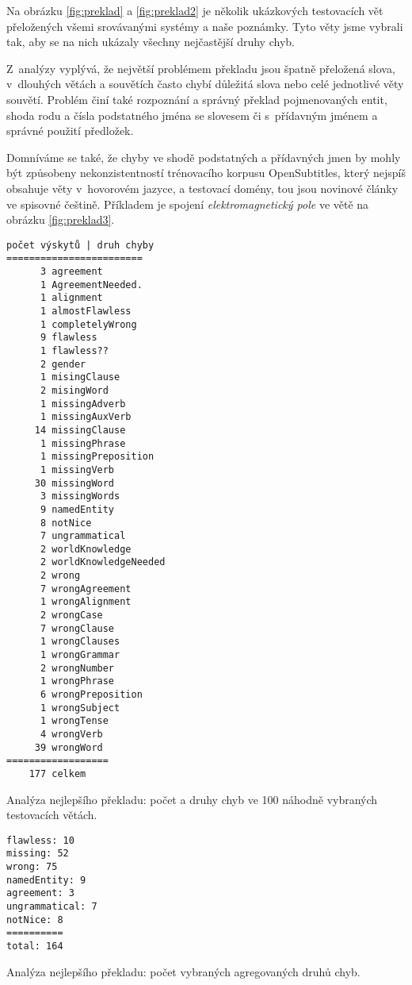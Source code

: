 \documentclass[a4]{article}
\begin{document}
Na obrázku \ref{fig:preklad} a \ref{fig:preklad2} je několik ukázkových
testovacích vět přeložených všemi srovávanými systémy a naše poznámky. Tyto věty
jsme vybrali tak, aby se na nich ukázaly všechny nejčastější druhy
chyb.

Z~analýzy vyplývá, že největší problémem překladu jsou špatně přeložená slova,
v~dlouhých větách a souvětích často chybí důležitá slova nebo celé jednotlivé věty
souvětí. Problém činí také rozpoznání a správný překlad pojmenovaných entit,
shoda rodu a čísla podstatného jména se slovesem či s~přídavným jménem
a správné použití předložek.

Domníváme se také, že chyby ve shodě podstatných a přídavných jmen by mohly být
způsobeny nekonzistentností trénovacího korpusu OpenSubtitles, který nejspíš
obsahuje věty v~hovorovém jazyce, a testovací domény, tou jsou novinové články
ve spisovné češtině. Příkladem je spojení \textit{elektromagnetický pole} ve
větě na obrázku \ref{fig:preklad3}.


\begin{table}[htpb]
\begin{verbatim}
počet výskytů | druh chyby
========================
      3 agreement
      1 AgreementNeeded.
      1 alignment
      1 almostFlawless
      1 completelyWrong
      9 flawless
      1 flawless??
      2 gender
      1 misingClause
      2 misingWord
      1 missingAdverb
      1 missingAuxVerb
     14 missingClause
      1 missingPhrase
      1 missingPreposition
      1 missingVerb
     30 missingWord
      3 missingWords
      9 namedEntity
      8 notNice
      7 ungrammatical
      2 worldKnowledge
      2 worldKnowledgeNeeded
      2 wrong
      7 wrongAgreement
      1 wrongAlignment
      2 wrongCase
      7 wrongClause
      1 wrongClauses
      1 wrongGrammar
      2 wrongNumber
      1 wrongPhrase
      6 wrongPreposition
      1 wrongSubject
      1 wrongTense
      4 wrongVerb
     39 wrongWord
==================
    177 celkem
\end{verbatim}
\caption{Analýza nejlepšího překladu: počet a druhy chyb ve 100 náhodně
vybraných testovacích větách.}
\label{tab:chyby}
\end{table}

\begin{table}[htpb]
\begin{verbatim}
flawless: 10
missing: 52
wrong: 75
namedEntity: 9
agreement: 3
ungrammatical: 7
notNice: 8
==========
total: 164
\end{verbatim}
\caption{Analýza nejlepšího překladu: počet vybraných agregovaných druhů chyb.}
\label{tab:chyby2}
\end{table}
\end{document}
